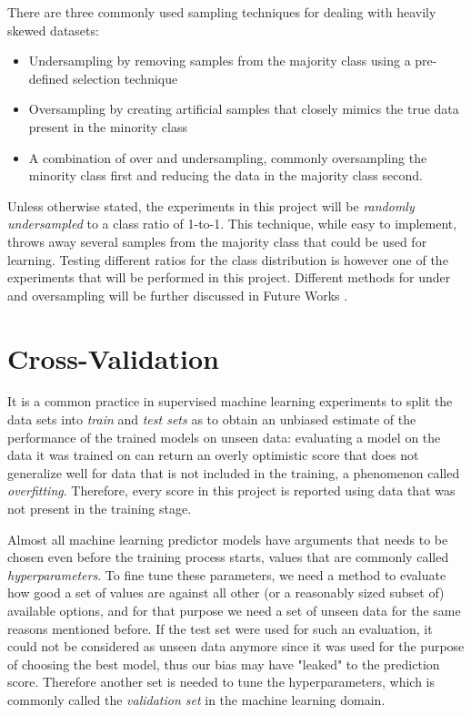 \documentclass{kththesis}
\begin{document}
There are three commonly used sampling techniques for dealing with heavily skewed datasets: 

\begin{itemize}
\item Undersampling by removing samples from the majority class using a pre-defined selection technique
\item Oversampling by creating artificial samples that closely mimics the true data present in the minority class
\item A combination of over and undersampling, commonly oversampling the minority class first and reducing the data in the majority class second.
\end{itemize}

Unless otherwise stated, the experiments in this project will be \emph{randomly undersampled} to a class ratio of 1-to-1. This technique, while easy to implement, throws away several samples from the majority class that could be used for learning. Testing different ratios for the class distribution is however one of the experiments that will be performed in this project. Different methods for under and oversampling will be further discussed in Future Works .

\section{Cross-Validation}

It is a common  practice in supervised machine learning experiments to split the data sets into \emph{train} and \emph{test sets} as to obtain an unbiased estimate of the performance of the trained models on unseen data: evaluating a model on the data it was trained on can return an overly optimistic score that does not generalize well for data that is not included in the training, a phenomenon called \emph{overfitting}. Therefore, every score in this project is reported using data that was not present in the training stage.

Almost all machine learning predictor models have arguments that needs to be chosen even before the training process starts, values that are commonly called \emph{hyperparameters}. To fine tune these parameters, we need a method to evaluate how good a set of values are against all other (or a reasonably sized subset of) available options, and for that purpose we need a set of unseen data for the same reasons mentioned before. If the test set were used for such an evaluation, it could not be considered as unseen data anymore since it was used for the purpose of choosing the best model, thus our bias may have "leaked" to the prediction score. Therefore another set is needed to tune the hyperparameters, which is commonly called the \emph{validation set} in the machine learning domain.
\end{document}
